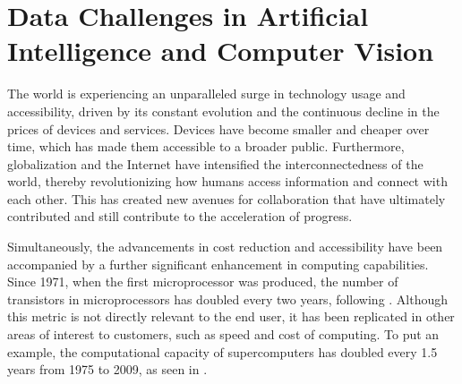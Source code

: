 
\section{Data Challenges in Artificial Intelligence and Computer Vision}\label{sec:data_challenges}

The world is experiencing an unparalleled surge in technology usage and accessibility, driven by its constant evolution and the continuous decline in the prices of devices and services. Devices have become smaller and cheaper over time, which has made them accessible to a broader public. Furthermore, globalization and the Internet have intensified the interconnectedness of the world, thereby revolutionizing how humans access information and connect with each other. This has created new avenues for collaboration that have ultimately contributed and still contribute to the acceleration of progress.


Simultaneously, the advancements in cost reduction and accessibility have been accompanied by a further significant enhancement in computing capabilities. Since 1971, when the first microprocessor was produced, the number of transistors in microprocessors has doubled every two years, following . Although this metric is not directly relevant to the end user, it has been replicated in other areas of interest to customers, such as speed and cost of computing. To put an example, the computational capacity of supercomputers has doubled every 1.5 years from 1975 to 2009, as seen in .


